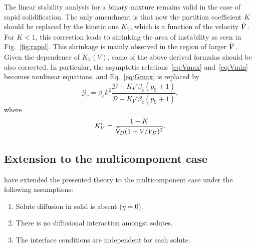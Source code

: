 \documentclass{article}
\newcommand{\sol}{\text{S}}
\newcommand{\hV}[1][\qty(\bar{V})]{\vphantom{#1}\mathrlap{\smash{\hat{V}}}V}
\begin{document}
The linear stability analysis for a binary mixture remains valid in the case of rapid solidification.
The only amendment is that now the partition coefficient $K$ should be replaced by the kinetic one $K_V$,
which is a function of the velocity $\hV$.
For $K<1$, this correction leads to shrinking the area of instability as seen in Fig.~\ref{fig:rapid}.
This shrinkage is mainly observed in the region of larger $\hV$.
Given the dependence of $K_V(V)$, some of the above derived formulas should be also corrected.
In particular, the asymptotic relations~\eqref{eq:Vmax} and~\eqref{eq:Vmin} becomes nonlinear equations,
and Eq.~\eqref{eq:Gmax} is replaced by
\begin{equation}\label{eq:Gmax_rapid}
    \mathcal{G}_c = \beta_ck^2\frac{\mathcal{D} + K_V'\beta_c(p_\sol+1)}{\mathcal{D} - K_V'\beta_c(p_\sol+1)},
\end{equation}
where
\begin{equation}\label{eq:dK_V}
    K_V' = \frac{1-K}{\hV_D(1+V/V_D)^2}.
\end{equation}

\subsection{Extension to the multicomponent case}

\textcite{coriell1987stability} have extended the presented theory to the multicomponent case
under the following assumptions:
\begin{enumerate}
    \item Solute diffusion in solid is absent ($\eta=0$).
    \item There is no diffusional interaction amongst solutes.
    \item The interface conditions are independent for each solute.
\end{enumerate}
\end{document}
